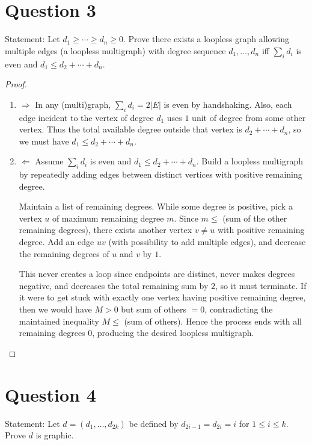 \documentclass[11pt]{article}
\begin{document}
\newpage
\section*{Question 3}
\noindent Statement: Let $d_1\ge\cdots\ge d_n\ge 0$. Prove there exists a loopless graph allowing multiple edges
(a loopless multigraph) with degree sequence $d_1,\dots,d_n$ iff $\sum_i d_i$ is even and $d_1\le d_2+\cdots+d_n$.

\begin{proof}
~
\begin{enumerate}
    \item $\Rightarrow$ In any (multi)graph, $\sum_i d_i=2|E|$ is even by handshaking.
Also, each edge incident to the vertex of degree $d_1$ uses $1$ unit of degree from some other vertex.
Thus the total available degree outside that vertex is $d_2+\cdots+d_n$, so we must have $d_1\le d_2+\cdots+d_n$.

\item $\Leftarrow$ Assume $\sum_i d_i$ is even and $d_1\le d_2+\cdots+d_n$.
Build a loopless multigraph by repeatedly adding edges between distinct vertices with positive remaining degree.

Maintain a list of remaining degrees. While some degree is positive, pick a vertex $u$ of maximum remaining degree $m$.
Since $m\le$ (sum of the other remaining degrees), there exists another vertex $v\neq u$ with positive remaining degree.
Add an edge $uv$ (with possibility to add multiple edges), and decrease the remaining degrees of
$u$ and $v$ by $1$.

This never creates a loop since endpoints are distinct, never makes degrees negative, and decreases the total remaining sum by $2$,
so it must terminate. If it were to get stuck with exactly one vertex having positive remaining degree, then we would have
$M>0$ but sum of others $=0$, contradicting the maintained inequality $M\le$ (sum of others).
Hence the process ends with all remaining degrees $0$, producing the desired loopless multigraph.
\end{enumerate}
\end{proof}

\newpage
\section*{Question 4}
\noindent Statement: Let $d=(d_1,\dots,d_{2k})$ be defined by $d_{2i-1}=d_{2i}=i$ for $1\le i\le k$. Prove $d$ is graphic.
\end{document}
